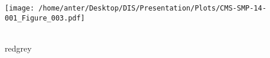 \begin{frame}
\hspace*{-10mm}
\begin{minipage}[thbp]{0.1\textwidth}
\vspace{13mm}
\hspace*{-4mm}\texttt{[image: /home/anter/Desktop/DIS/Presentation/Plots/CMS-SMP-14-001\_Figure\_003.pdf]}\\ \\
\hspace*{35mm}\begin{beamercolorbox}[wd=23mm,ht=1mm,center,shadow=true, rounded=true]{redgrey}
{}
{\scalebox {0.61} {}}
\end{beamercolorbox}
\end{minipage}
\end{frame}


